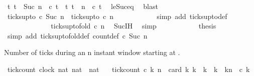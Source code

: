 \begin{isabellebody}
\ {\isacartoucheopen}{\isacharbraceleft}t{\isachardot}\ t\ {\isasymle}\ Suc\ n\ {\isasymand}\ c\ t{\isacharbraceright}\ {\isacharequal}\ {\isacharbraceleft}t{\isachardot}\ t\ {\isasymle}\ n\ {\isasymand}\ c\ t{\isacharbraceright}{\isacartoucheclose}\ \isamarkupfalse%
\ le{\isacharunderscore}Suc{\isacharunderscore}eq\ \isamarkupfalse%
\ blast\isanewline
\ \ \ \ \ \ \ \ \isamarkupfalse%
\ {\isacartoucheopen}ticks{\isacharunderscore}up{\isacharunderscore}to\ c\ {\isacharparenleft}Suc\ n{\isacharparenright}\ {\isacharequal}\ ticks{\isacharunderscore}up{\isacharunderscore}to\ c\ n{\isacartoucheclose}\isanewline
\ \ \ \ \ \ \ \ \ \ \isamarkupfalse%
\ {\isacharparenleft}simp\ add{\isacharcolon}\ ticks{\isacharunderscore}up{\isacharunderscore}to{\isacharunderscore}def{\isacharparenright}\isanewline
\ \ \ \ \ \ \ \ \isamarkupfalse%
\ \isamarkupfalse%
\ {\isacartoucheopen}{\isachardot}{\isachardot}{\isachardot}\ {\isacharequal}\ ticks{\isacharunderscore}up{\isacharunderscore}to{\isacharunderscore}fold\ c\ n{\isacartoucheclose}\ \isamarkupfalse%
\ Suc{\isachardot}IH\ \isamarkupfalse%
\ simp\isanewline
\ \ \ \ \ \ \ \ \isamarkupfalse%
\ \isamarkupfalse%
\ {\isacharquery}thesis\ \isamarkupfalse%
\ {\isacharparenleft}simp\ add{\isacharcolon}\ ticks{\isacharunderscore}up{\isacharunderscore}to{\isacharunderscore}fold{\isacharunderscore}def\ count{\isacharunderscore}def\ {\isacartoucheopen}{\isasymnot}c\ {\isacharparenleft}Suc\ n{\isacharparenright}{\isacartoucheclose}{\isacharparenright}\isanewline
\ \ \ \ \isamarkupfalse%
\isanewline
{}\isamarkupfalse%
%
\endisatagproof
{\isafoldproof}%
%
\isadelimproof
%
\endisadelimproof
%
\begin{isamarkuptext}%
Number of ticks during an n instant window starting at .%
\end{isamarkuptext}\isamarkuptrue%
\isamarkupfalse%
\ tick{\isacharunderscore}count\ {\isacharcolon}{\isacharcolon}{\isacartoucheopen}{\isacharbrackleft}clock{\isacharcomma}\ nat{\isacharcomma}\ nat{\isacharbrackright}\ {\isasymRightarrow}\ nat{\isacartoucheclose}\isanewline
\ \ \ {\isacartoucheopen}tick{\isacharunderscore}count\ c\ k\ n\ {\isasymequiv}\ card\ {\isacharbraceleft}k{\isachardot}\ k\ {\isasymle}\ k\ {\isasymand}\ k\ {\isacharless}\ kn\ {\isasymand}\ c\ k{\isacharbraceright}{\isacartoucheclose}%

\end{isabellebody}
